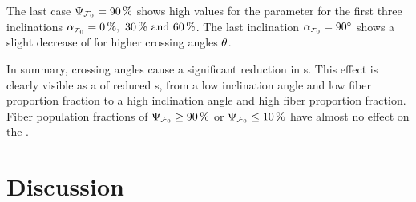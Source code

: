 \par
%
The last case $\textnormal{$\Psi_{\textnormal{$\mathcal{F}_0$}}$}=\SI{90}{\percent}$ shows high values for the \accvalue{} parameter for the first three inclinations $\modelInc=\SIlist{0;30;60}{\percent}$.
The last inclination $\modelInc=\SI{90}{\degree}$ shows a slight decrease of \accvalue{} for higher crossing angles $\textnormal{$\theta$}$.
\par
%
In summary, crossing angles cause a significant reduction in \accvalue{}s.
This effect is clearly visible as a  of reduced \accvalue{}s, from a low inclination angle and low fiber proportion fraction to a high inclination angle and high fiber proportion fraction.
Fiber population fractions of $\textnormal{$\Psi_{\textnormal{$\mathcal{F}_0$}}$} \geq \SI{90}{\percent}$ or $\textnormal{$\Psi_{\textnormal{$\mathcal{F}_0$}}$} \leq \SI{10}{\percent}$ have almost no effect on the \accvalue{}.
%
% 
% 
\section{Discussion}
%
